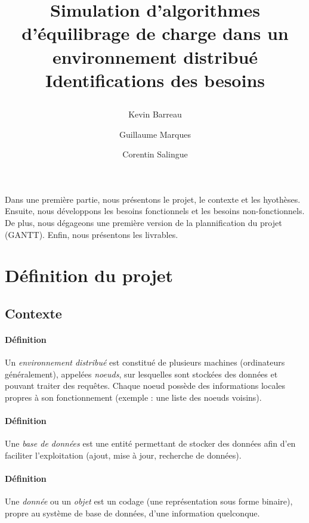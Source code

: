 \documentclass[12pt]{article}
\title{
 \begin{minipage}\linewidth
        \centering
        Simulation d'algorithmes d'équilibrage de charge dans un environnement distribué 
        \vskip3pt
        \large Identifications des besoins
    \end{minipage}
 }
\author{Kevin Barreau \and Guillaume Marques \and Corentin Salingue}
\begin{document}
\maketitle

\abstract
Dans une première partie, nous présentons le projet, le contexte et les hyothèses. Ensuite, nous développons les besoins fonctionnels et les besoins non-fonctionnels.
De plus, nous dégageons une première version de la plannification du projet (GANTT). Enfin, nous présentons les livrables.



\newpage


\renewcommand{\contentsname}{Sommaire} 
\tableofcontents



\newpage

\section{Définition du projet}

\subsection{Contexte}

\paragraph{Définition} Un \textit{environnement distribué} est constitué de plusieurs machines (ordinateurs généralement), appelées \textit{noeuds}, sur lesquelles sont stockées des données et pouvant traiter des requêtes. Chaque noeud possède des informations locales propres à son fonctionnement (exemple : une liste des noeuds voisins).

\paragraph{Définition} Une \textit{base de données} est une entité permettant de stocker des données afin d'en faciliter l'exploitation (ajout, mise à jour, recherche de données).

\paragraph{Définition} Une \textit{donnée} ou un \textit{objet} est un codage (une représentation sous forme binaire), propre au système de base de données, d'une information quelconque.
\end{document}
